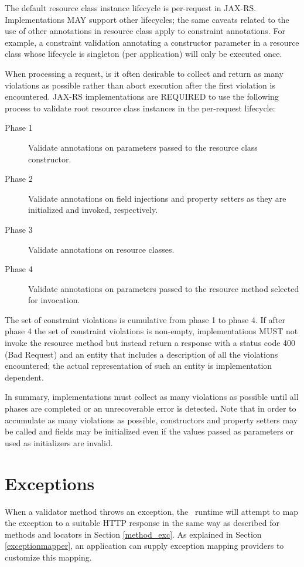 The default resource class instance lifecycle is per-request in JAX-RS. Implementations MAY support other lifecycles; the same caveats related to the use of other annotations in resource class apply to constraint annotations. For example, a constraint validation annotating a constructor parameter in a resource class whose lifecycle is singleton (per application) will only be executed once.

When processing a request, is it often desirable to collect and return as many violations as possible rather than abort execution after the first violation is encountered. JAX-RS implementations are REQUIRED to use the following process to validate root resource class instances in the per-request lifecycle:

\begin{description}
\item[Phase 1] Validate annotations on parameters passed to the resource class constructor.
\item[Phase 2] Validate annotations on field injections and property setters as they are initialized and invoked, respectively.
\item[Phase 3] Validate annotations on resource classes.
\item[Phase 4] Validate annotations on parameters passed to the resource method selected for invocation.
\end{description}

The set of constraint violations is cumulative from phase 1 to phase 4. If after phase 4 the set of constraint violations is non-empty, implementations MUST not invoke the resource method but instead return a response with a status code 400 (Bad Request) and an entity that includes a description of all the violations encountered; the actual representation of such an entity is implementation dependent. 


 In summary, implementations must collect as many violations as possible until all phases are completed or an unrecoverable error is detected. Note that in order to accumulate as many violations as possible, constructors and property setters may be called and fields may be initialized even if the values passed as parameters or used as initializers are invalid.

\section{Exceptions}
\label{exceptions_validators}

When a validator method throws an exception, the \jaxrs\ runtime will attempt to map the exception to a suitable HTTP response in the same way as described for methods and locators in Section \ref{method_exc}.  As explained in Section \ref{exceptionmapper}, an application can supply exception mapping providers to customize this mapping.




